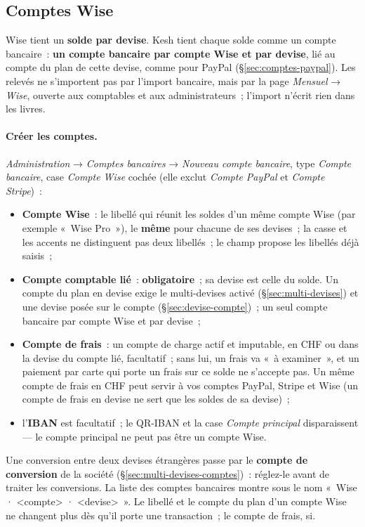 \documentclass[a4paper,11pt,oneside]{article}
\begin{document}
\subsection{Comptes Wise}\label{sec:comptes-wise}

Wise tient un \textbf{solde par devise}. Kesh tient chaque solde comme un compte bancaire~: \textbf{un compte bancaire par compte Wise et par devise}, lié au compte du plan de cette devise, comme pour PayPal (\S\ref{sec:comptes-paypal}). Les relevés ne s'importent pas par l'import bancaire, mais par la page \emph{Mensuel} → \emph{Wise}, ouverte aux comptables et aux administrateurs~; l'import n'écrit rien dans les livres.

\paragraph{Créer les comptes.} \emph{Administration} → \emph{Comptes bancaires} → \emph{Nouveau compte bancaire}, type \emph{Compte bancaire}, case \emph{Compte Wise} cochée (elle exclut \emph{Compte PayPal} et \emph{Compte Stripe})~:
\begin{itemize}
    \item \textbf{Compte Wise}~: le libellé qui réunit les soldes d'un même compte Wise (par exemple «~Wise Pro~»), le \textbf{même} pour chacune de ses devises~; la casse et les accents ne distinguent pas deux libellés~; le champ propose les libellés déjà saisis~;
    \item \textbf{Compte comptable lié}~: \textbf{obligatoire}~; sa devise est celle du solde. Un compte du plan en devise exige le multi-devises activé (\S\ref{sec:multi-devises}) et une devise posée sur le compte (\S\ref{sec:devise-compte})~; un seul compte bancaire par compte Wise et par devise~;
    \item \textbf{Compte de frais}~: un compte de charge actif et imputable, en CHF ou dans la devise du compte lié, facultatif~; sans lui, un frais va «~à examiner~», et un paiement par carte qui porte un frais sur ce solde ne s'accepte pas. Un même compte de frais en CHF peut servir à vos comptes PayPal, Stripe et Wise (un compte de frais en devise ne sert que les soldes de sa devise)~;
    \item l'\textbf{IBAN} est facultatif~; le QR-IBAN et la case \emph{Compte principal} disparaissent --- le compte principal ne peut pas être un compte Wise.
\end{itemize}
Une conversion entre deux devises étrangères passe par le \textbf{compte de conversion} de la société (\S\ref{sec:multi-devises-comptes})~: réglez-le avant de traiter les conversions. La liste des comptes bancaires montre sous le nom «~Wise · <compte> · <devise>~». Le libellé et le compte du plan d'un compte Wise ne changent plus dès qu'il porte une transaction~; le compte de frais, si.
\end{document}
